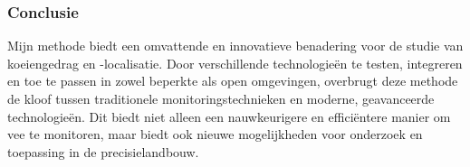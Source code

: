 \subsubsection{Conclusie}
Mijn methode biedt een omvattende en innovatieve benadering voor de studie van koeiengedrag en -localisatie. Door verschillende technologieën te testen, integreren en toe te passen in zowel beperkte als open omgevingen, overbrugt deze methode de kloof tussen traditionele monitoringstechnieken en moderne, geavanceerde technologieën. Dit biedt niet alleen een nauwkeurigere en efficiëntere manier om vee te monitoren, maar biedt ook nieuwe mogelijkheden voor onderzoek en toepassing in de precisielandbouw.